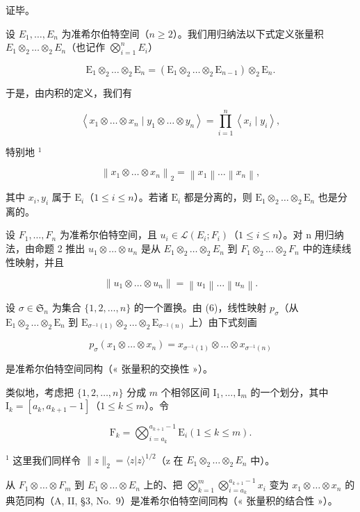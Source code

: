 证毕。

设 \(E_1, \ldots, E_n\) 为准希尔伯特空间（\(n \geqslant 2\)）。我们用归纳法以下式定义张量积 \(E_1 \otimes_2 \ldots \otimes_2 E_n\)（也记作 \(\bigotimes_{i=1}^{n} E_i\)）

\[
\mathrm{E} _ {1} \otimes_ {2} \dots \otimes_ {2} \mathrm{E} _ {n} = (\mathrm{E} _ {1} \otimes_ {2} \dots \otimes_ {2} \mathrm{E} _ {n - 1}) \otimes_ {2} \mathrm{E} _ {n}.
\]

于是，由内积的定义，我们有

\[
\left\langle x _ {1} \otimes \dots \otimes x _ {n} \mid y _ {1} \otimes \dots \otimes y _ {n} \right\rangle = \prod_ {i = 1} ^ {n} \left\langle x _ {i} \mid y _ {i} \right\rangle ,\tag{6}
\]

特别地 \(^{1}\)

\[
\left\| x _ {1} \otimes \dots \otimes x _ {n} \right\| _ {2} = \left\| x _ {1} \right\| \dots \left\| x _ {n} \right\|,\tag{7}
\]

其中 \(x_{i},y_{i}\) 属于 \(\mathrm{E}_i\)（\(1\leqslant i\leqslant n\)）。若诸 \(\mathrm{E}_i\) 都是分离的，则 \(\mathrm{E}_1\otimes_2\dots \otimes_2\mathrm{E}_n\) 也是分离的。

设 \(F_{1}, \ldots, F_{n}\) 为准希尔伯特空间，且 \(u_{i} \in \mathcal{L}(E_{i}; F_{i})\)（\(1 \leqslant i \leqslant n\)）。对 n 用归纳法，由命题 2 推出 \(u_{1} \otimes \ldots \otimes u_{n}\) 是从 \(E_{1} \otimes_{2} \ldots \otimes_{2} E_{n}\) 到 \(F_{1} \otimes_{2} \ldots \otimes_{2} F_{n}\) 中的连续线性映射，并且

\[
\left\| u _ {1} \otimes \dots \otimes u _ {n} \right\| = \left\| u _ {1} \right\| \dots \left\| u _ {n} \right\|.\tag{8}
\]

设 \(\sigma \in \mathfrak{S}_n\) 为集合 \(\{1, 2, \dots, n\}\) 的一个置换。由 (6)，线性映射 \(p_{\sigma}\)（从 \(\mathrm{E}_1 \otimes_2 \dots \otimes_2 \mathrm{E}_n\) 到 \(\mathrm{E}_{\sigma^{-1}(1)} \otimes_2 \dots \otimes_2 \mathrm{E}_{\sigma^{-1}(n)}\) 上）由下式刻画

\[
p _ {\sigma} \left(x _ {1} \otimes \dots \otimes x _ {n}\right) = x _ {\sigma^ {- 1} (1)} \otimes \dots \otimes x _ {\sigma^ {- 1} (n)}\tag{9}
\]

是准希尔伯特空间同构（« 张量积的交换性 »）。

类似地，考虑把 \(\{1, 2, \dots , n\}\) 分成 \(m\) 个相邻区间 \(\mathrm{I}_{1}, \dots , \mathrm{I}_{m}\) 的一个划分，其中 \(\mathrm{I}_{k} = [a_{k}, a_{k + 1} - 1]\)（\(1 \leqslant k \leqslant m\)）。令

\[
\mathrm{F} _ {k} = \bigotimes_ {i = a _ {k}} ^ {a _ {k + 1} - 1} \mathrm{E} _ {i} (1 \leqslant k \leqslant m).
\]

\(^{1}\) 这里我们同样令 \(\|z\|_{2} = \langle z|z\rangle^{1/2}\)（z 在 \(E_{1} \otimes_{2} \ldots \otimes_{2} E_{n}\) 中）。

从 \(F_{1} \otimes \ldots \otimes F_{m}\) 到 \(E_{1} \otimes \ldots \otimes E_{n}\) 上的、把 \(\bigotimes_{k=1}^{m} \bigotimes_{i=a_{k}}^{a_{k+1}-1} x_{i}\) 变为 \(x_{1} \otimes \ldots \otimes x_{n}\) 的典范同构（A, II, §3, No.~9）是准希尔伯特空间同构（« 张量积的结合性 »）。

